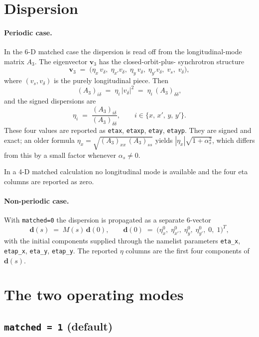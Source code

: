 \documentclass[11pt]{article}
\begin{document}
\section{Dispersion}

\paragraph{Periodic case.}
In the 6-D matched case the dispersion is read off from the longitudinal-mode
matrix $A_3$. The eigenvector $\mathbf{v}_3$ has the closed-orbit-plus-
synchrotron structure
\[
   \mathbf{v}_3 \;=\;
   \bigl( \eta_x\,v_\delta,\; \eta_{x'} v_\delta,\;
          \eta_y\,v_\delta,\; \eta_{y'} v_\delta,\;
          v_s,\; v_\delta \bigr) ,
\]
where $(v_s, v_\delta)$ is the purely longitudinal piece. Then
\[
   (A_3)_{i\delta} \;=\; \eta_i\,|v_\delta|^2 \;=\; \eta_i\,(A_3)_{\delta\delta} ,
\]
and the signed dispersions are
\[
   \boxed{\;
   \eta_i \;=\; \frac{(A_3)_{i\delta}}{(A_3)_{\delta\delta}} ,
   \qquad i \in \{x,\,x',\,y,\,y'\} .
   \;}
\]
These four values are reported as \verb|etax|, \verb|etaxp|, \verb|etay|,
\verb|etayp|. They are signed and exact; an older formula
$\eta_x = \sqrt{(A_3)_{xx}\,(A_3)_{ss}}$ yields $|\eta_x|\sqrt{1+\alpha_s^2}$,
which differs from this by a small factor whenever $\alpha_s\ne 0$.

In a 4-D matched calculation no longitudinal mode is available and the
four eta columns are reported as zero.

\paragraph{Non-periodic case.}
With \verb|matched=0| the dispersion is propagated as a separate 6-vector
\[
   \mathbf{d}(s) \;=\; M(s)\,\mathbf{d}(0) ,
   \qquad
   \mathbf{d}(0) \;=\;
   \bigl(\eta_x^0,\; \eta_{x'}^0,\; \eta_y^0,\; \eta_{y'}^0,\; 0,\; 1\bigr)^T ,
\]
with the initial components supplied through the namelist parameters
\verb|eta_x|, \verb|etap_x|, \verb|eta_y|, \verb|etap_y|. The reported
$\eta$ columns are the first four components of $\mathbf{d}(s)$.

\section{The two operating modes}

\subsection*{\texttt{matched = 1} (default)}
\end{document}
